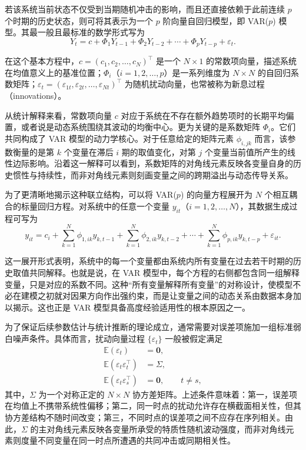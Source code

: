 \documentclass[UTF8,a4paper,12pt]{ctexbook}
\begin{document}
若该系统当前状态不仅受到当期随机冲击的影响，而且还直接依赖于此前连续 $p$ 个时期的历史状态，则可将其表示为一个 $p$ 阶向量自回归模型，即 VAR($p$) 模型。其最一般且最标准的数学形式写为
\begin{equation}
Y_t = c + \Phi_1 Y_{t-1} + \Phi_2 Y_{t-2} + \cdots + \Phi_p Y_{t-p} + \varepsilon_t.
\end{equation}

在这个基本方程中，$c=(c_1,c_2,\dots,c_N)^\top$ 是一个 $N\times 1$ 的常数项向量，描述系统在均值意义上的基准位置；$\Phi_i$（$i=1,2,\dots,p$）是一系列维度为 $N\times N$ 的自回归系数矩阵；$\varepsilon_t=(\varepsilon_{1t},\varepsilon_{2t},\dots,\varepsilon_{Nt})^\top$ 为随机扰动向量，也常被称为新息过程（innovations）。

从统计解释来看，常数项向量 $c$ 对应于系统在不存在额外趋势项时的长期平均偏置，或者说是动态系统围绕其波动的均衡中心。更为关键的是系数矩阵 $\Phi_i$。它们共同构成了 VAR 模型的动力学核心。对于任意给定的矩阵元素 $\phi_{i,jk}$ 而言，该参数衡量的是第 $k$ 个变量在滞后 $i$ 期的取值变化，对第 $j$ 个变量当前值所产生的线性边际影响。沿着这一解释可以看到，系数矩阵的对角线元素反映各变量自身的历史惯性与持续性，而非对角线元素则刻画变量之间的跨期溢出与动态传导关系。

为了更清晰地揭示这种联立结构，可以将 VAR($p$) 的向量方程展开为 $N$ 个相互耦合的标量回归方程。对系统中的任意一个变量 $y_{it}$（$i=1,2,\dots,N$），其数据生成过程可写为
\begin{equation}
 y_{it} = c_i + \sum_{k=1}^{N}\phi_{1,ik}y_{k,t-1} + \sum_{k=1}^{N}\phi_{2,ik}y_{k,t-2} + \cdots + \sum_{k=1}^{N}\phi_{p,ik}y_{k,t-p} + \varepsilon_{it}.
\end{equation}

这一展开形式表明，系统中的每一个变量都由系统内所有变量在过去若干时期的历史取值共同解释。也就是说，在 VAR 模型中，每个方程的右侧都包含同一组解释变量，只是对应的系数不同。这种“所有变量解释所有变量”的对称设计，使模型不必在建模之初就对因果方向作出强约束，而是让变量之间的动态关系由数据本身加以揭示。这也正是 VAR 模型具备高度经验适用性的根本原因之一。

为了保证后续参数估计与统计推断的理论成立，通常需要对误差项施加一组标准弱白噪声条件。具体而言，扰动向量过程 $\{\varepsilon_t\}$ 一般被假定满足
\begin{align}
\mathbb{E}(\varepsilon_t) &= \bm{0},\\
\mathbb{E}(\varepsilon_t\varepsilon_t^\top) &= \Sigma,\\
\mathbb{E}(\varepsilon_t\varepsilon_s^\top) &= \bm{0}, \qquad t\neq s,
\end{align}
其中，$\Sigma$ 为一个对称正定的 $N\times N$ 协方差矩阵。上述条件意味着：第一，误差项在均值上不携带系统性偏移；第二，同一时点的扰动允许存在横截面相关性，但其协方差结构不随时间改变；第三，不同时点的误差项之间不应存在序列相关。由此，$\Sigma$ 的主对角线元素反映各变量所承受的特质性随机波动强度，而非对角线元素则度量不同变量在同一时点所遭遇的共同冲击或同期相关性。
\end{document}
